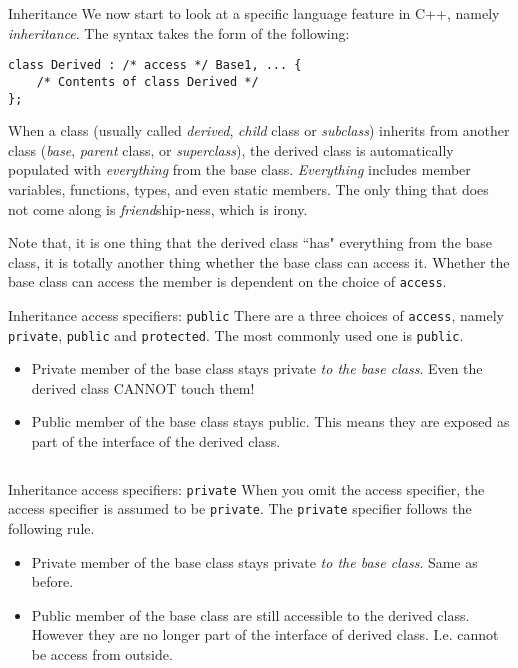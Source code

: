 \begin{frame}[fragile]{Inheritance}
We now start to look at a specific language feature in C++, namely \textit{inheritance}. The syntax takes the form of the following:
\begin{verbatim}
class Derived : /* access */ Base1, ... {
    /* Contents of class Derived */
};
\end{verbatim}

When a class (usually called \textit{derived}, \textit{child} class or \textit{subclass}) inherits from another class (\textit{base}, \textit{parent} class, or \textit{superclass}), the derived class is automatically populated with \textit{everything} from the base class. \textit{Everything} includes member variables, functions, types, and even static members. The only thing that does not come along is \textit{friend}ship-ness, which is irony. 

Note that, it is one thing that the derived class ``has" everything from the base class, it is totally another thing whether the base class can access it. Whether the base class can access the member is dependent on the choice of \texttt{access}.
\end{frame}

\begin{frame}[fragile]{Inheritance access specifiers: \texttt{public}}
There are a three choices of \texttt{access}, namely \texttt{private}, \texttt{public} and \texttt{protected}. The most commonly used one is \texttt{public}. 

\begin{itemize}
	\item Private member of the base class stays private \textit{to the base class}. Even the derived class CANNOT touch them!
	\item Public member of the base class stays public. This means they are exposed as part of the interface of the derived class.
\end{itemize}

\inputminted[fontsize=\small]{c++}{code/rc10access/public.h}
\end{frame}

\begin{frame}[fragile]{Inheritance access specifiers: \texttt{private}}
When you omit the access specifier, the access specifier is assumed to be \texttt{private}. The \texttt{private} specifier follows the following rule. 

\begin{itemize}
	\item Private member of the base class stays private \textit{to the base class}. Same as before. 
	\item Public member of the base class are still accessible to the derived class. However they are no longer part of the interface of derived class. I.e. cannot be access from outside. 
\end{itemize}

\inputminted[fontsize=\small]{c++}{code/rc10access/private.h}
\end{frame}

